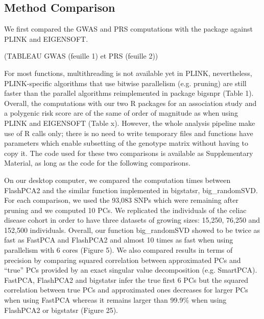 \documentclass{bioinfo}
\begin{document}
\subsection{Method Comparison}

We first compared the GWAS and PRS computations with the package against PLINK and EIGENSOFT.

(TABLEAU GWAS (feuille 1) et PRS (feuille 2))

For most functions, multithreading is not available yet in PLINK, nevertheless, PLINK-specific algorithms that use bitwise parallelism (e.g. pruning) are still faster than the parallel algorithms reimplemented in package bigsnpr (Table 1). Overall, the computations with our two R packages for an association study and a polygenic risk score are of the same of order of magnitude as when using PLINK and EIGENSOFT (Table x). However, the whole analysis pipeline make use of R calls only; there is no need to write temporary files and functions have parameters which enable subsetting of the genotype matrix without having to copy it. The code used for these two comparisons is available as Supplementary Material, as long as the code for the following comparisons.

On our desktop computer, we compared the computation times between FlashPCA2 and the similar function implemented in bigstatsr, big\_randomSVD. For each comparison, we used the 93,083 SNPs which were remaining after pruning and we computed 10 PCs. We replicated the individuals of the celiac disease cohort in order to have three datasets of growing sizes: 15,250, 76,250 and 152,500 individuals. Overall, our function big\_randomSVD showed to be twice as fast as FastPCA and FlashPCA2 and almost 10 times as fast when using parallelism with 6 cores (Figure 5). We also compared results in terms of precision by comparing squared correlation between approximated PCs and ``true'' PCs provided by an exact singular value decomposition (e.g. SmartPCA). FastPCA, FlashPCA2 and bigstatsr infer the true first 6 PCs but the squared correlation between true PCs and approximated ones decreases for larger PCs when using FastPCA whereas it remains larger than 99.9\% when using FlashPCA2 or bigstatsr (Figure 25).   
\end{document}
